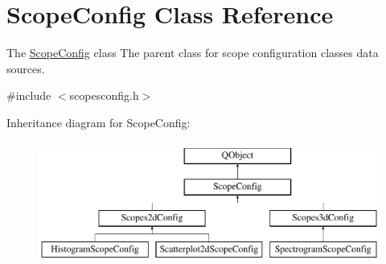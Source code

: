 \hypertarget{class_scope_config}{\section{Scope\-Config Class Reference}
\label{class_scope_config}
}


The \hyperlink{class_scope_config}{Scope\-Config} class The parent class for scope configuration classes data sources.  




{\ttfamily \#include $<$scopesconfig.\-h$>$}

Inheritance diagram for Scope\-Config\-:\begin{figure}[H]
\begin{center}
\leavevmode
\includegraphics[height=4.000000cm]{class_scope_config}
\end{center}
\end{figure}
